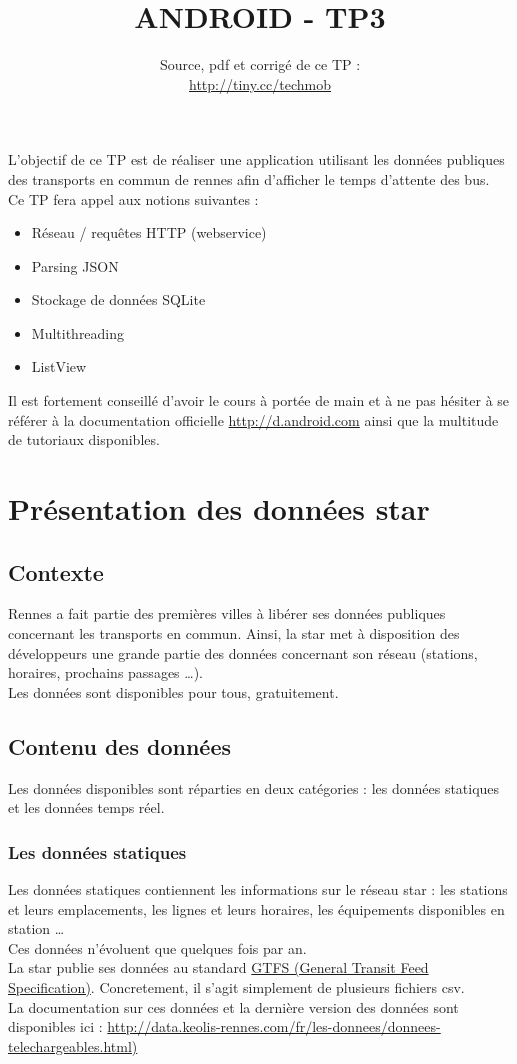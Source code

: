 \documentclass{article}
\title{ANDROID - TP3}
\date{Source, pdf et corrigé de ce TP
:\\\href{http://tiny.cc/techmob}{http://tiny.cc/techmob}}
\begin{document}
\maketitle
L'objectif de ce TP est de réaliser une application utilisant les données
publiques des transports en commun de rennes afin d'afficher le temps
d'attente des bus.\\
Ce TP fera appel aux notions suivantes :
\begin{itemize}
  \item Réseau / requêtes HTTP (webservice)
  \item Parsing JSON
  \item Stockage de données SQLite
  \item Multithreading
  \item ListView
\end{itemize}
Il est fortement conseillé d'avoir le cours à portée de main et à ne pas hésiter
à se référer à la documentation officielle
\href{http://d.android.com}{http://d.android.com} ainsi que la multitude de tutoriaux disponibles.\\
\section{Présentation des données star}
\subsection{Contexte}
Rennes a fait partie des premières villes à libérer ses données publiques
concernant les transports en commun. Ainsi, la star met à disposition des
développeurs une grande partie des données concernant son réseau (stations,
horaires, prochains passages \ldots).\\
Les données sont disponibles pour tous, gratuitement.
\subsection{Contenu des données}
Les données disponibles sont réparties en deux catégories : les données
statiques et les données temps réel.
\subsubsection{Les données statiques}
Les données statiques contiennent les informations sur le réseau star : les
stations et leurs emplacements, les lignes et leurs horaires, les équipements
disponibles en station \ldots\\
Ces données n'évoluent que quelques fois par an.\\
La star publie ses données au standard \href{https://developers.google.com/transit/gtfs/reference}{GTFS (General
Transit Feed Specification)}. Concretement, il s'agit simplement de plusieurs
fichiers csv.\\
La documentation sur ces données et la dernière version des données sont
disponibles ici :
\href{http://data.keolis-rennes.com/fr/les-donnees/donnees-telechargeables.html}{http://data.keolis-rennes.com/fr/les-donnees/donnees-telechargeables.html)}
\end{document}
